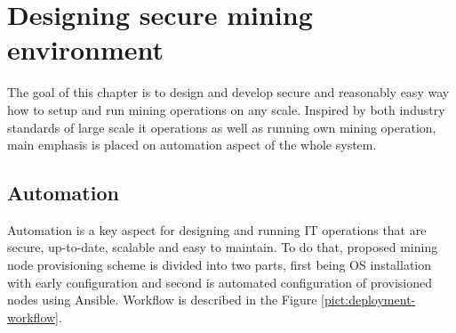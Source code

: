 \documentclass[
  printed, %
  table,   %
  nolof,     %
  nolot,     %
           oneside, color
]{fithesis3}
\begin{document}
\chapter{Designing secure mining environment}
The goal of this chapter is to design and develop secure and reasonably easy way how to setup and run mining operations on any scale. Inspired by both industry standards of large scale it operations as well as running own mining operation, main emphasis is placed on automation aspect of the whole system.
\section{Automation}
Automation is a key aspect for designing and running IT operations that are secure, up-to-date, scalable and easy to maintain. To do that, proposed mining node provisioning scheme is divided into two parts, first being OS installation with early configuration and second is automated configuration of provisioned nodes using Ansible. Workflow is described in the Figure \ref{pict:deployment-workflow}.
\end{document}
